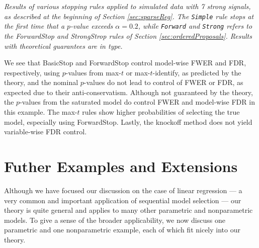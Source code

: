 \documentclass{article}
\begin{document}
\begin{table}[ht]
\centering

\caption[tab:stopping]{\em Results of various stopping rules applied to simulated data with 7 strong signals,  as described at the beginning of Section \ref{sec:sparseReg}.
The {\tt Simple} rule stops at the first time that a $p$-value exceeds $\alpha=0.2$, while {\tt Forward} and {\tt Strong} refers to the ForwardStop and StrongStrop rules of Section \ref{sec:orderedProposals}. Results with theoretical guarantees are in  type.}
\label{tab:stopping20}
\end{table}


We see that BasicStop and ForwardStop control model-wise FWER and FDR, respectively, using $p$-values from max-$t$ or max-$t$-identify, as predicted by the theory, and the nominal $p$-values do not lead to control of FWER or FDR, as expected due to their anti-conservatism. Although not guaranteed by the theory, the $p$-values from the saturated model do control FWER and model-wise FDR in this example.  The max-$t$ rules show higher probabilities of selecting the true model, especially using ForwardStop.  Lastly, the knockoff method does not yield variable-wise FDR control. 


\section{Futher Examples and Extensions}\label{sec:further-examples}

Although we have focused our discussion on the case of linear regression --- a very common and important application of sequential model selection --- our theory is quite general and applies to many other parametric and nonparametric models. To give a sense of the broader applicability, we now discuss one parametric and one nonparametric example, each of which fit nicely into our theory.
\end{document}
